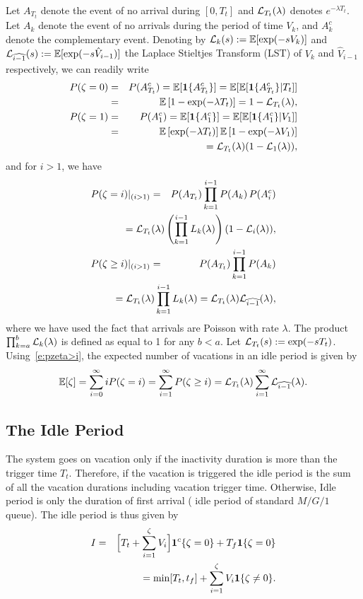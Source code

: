 \documentclass[journal]{IEEEtran}
\newcommand {\beq} {\begin{equation}}
\newcommand {\eeq} {\end{equation}}
\newcommand {\bear} {\begin{eqnarray}}
\newcommand {\eear} {\end{eqnarray}}
\def \E{{\mathbb E}}
\def\bone{{\mathrm 1\!\!I}}
\def\bone{{\textbf 1}}
\begin{document}
Let $A_{T_t}$ denote the event of no arrival during $[0,T_t]$ and ${\cal L}_{T_t}(\lambda)$ denotes  $e^{-\lambda T_t}$. Let $A_k$ denote the event of no arrivals during the period of time $V_k$, and $A_k^c$ denote the complementary event. Denoting by ${\cal L}_k(s):=\E[\exp(-s V_k)]$ and ${\cal L}_{\widehat{i-1}}(s):=\E[\exp(-s \hat{V}_{i-1})]$ the Laplace Stieltjes Transform (LST) of $V_k$ and $\hat V_{i-1}$ respectively, we can readily write \vspace{-1mm}
\bear
P(\zeta=0)&=&P(A_{T_t}^c)=\E[\bone\{A_{T_t}^c\}]=\E[\E[\bone\{A_{T_t}^c\}|T_t]]
\nonumber\\ 
\label{e:pzeta-0}&=& \E\left[1-\exp(-\lambda T_t)\right]=1-{\cal L}_{T_t}(\lambda),\\
P(\zeta=1)&=&P(A_1^c)=\E[\bone\{A_1^c\}]=\E[\E[\bone\{A_1^c\}|V_1]]
\nonumber\\
&=&\nonumber\E\left[\exp(-\lambda T_t)\right]\E\left[1-\exp(-\lambda V_1)\right]\\
&&={\cal L}_{T_t}(\lambda)(1-{\cal L}_1(\lambda)),
\label{e:pzeta-1}
\eear
and for $i>1$, we have\vspace{-1mm}
\bear
P(\zeta=i)|_{(i>1)}&=&P(A_{T_t})\prod_{k=1}^{i-1}P(A_k)\,P(A_i^c)\nonumber\\
&&\hspace{-20mm}={\cal L}_{T_t}(\lambda)\left(\prod_{k=1}^{i-1}L_k(\lambda)\right)(1-{\cal L}_i(\lambda)),
\label{e:pzeta-i}\\
\nonumber P(\zeta\geq i)|_{(i>1)}&=&P(A_{T_t})\prod_{k=1}^{i-1}P(A_k)\\
&&\hspace{-20mm}={\cal L}_{T_t}(\lambda)\prod_{k=1}^{i-1}L_k(\lambda)
= {\cal L}_{T_t}(\lambda){\cal L}_{\widehat{i-1}}(\lambda), \label{e:pzeta>i} \eear
where we have used the fact that arrivals are Poisson with rate $\lambda$. The product $\prod_{k=a}^b{\cal L}_k(\lambda)$ is defined as equal to 1 for any $b<a$. Let ${\cal L}_{T_t}(s):=\exp(-s
T_t)$. Using~\eqref{e:pzeta>i}, the expected number of vacations in an idle period is given by
\beq 
\E[\zeta]=\sum_{i=0}^{\infty}iP(\zeta=i)=\sum_{i=1}^{\infty}P(\zeta\geq i)
={\cal L}_{T_t}(\lambda)\sum_{i=1}^{\infty}{\cal L}_{\widehat{i-1}}(\lambda).
\label{e:Ezeta}
\eeq

\subsection{The Idle Period}
The system goes on vacation only if the inactivity duration is more than the trigger time $T_t$. Therefore, if the vacation is triggered the idle period is the sum of all the vacation durations including vacation trigger time. Otherwise, Idle period is only the duration of first arrival ( idle period of standard $M/G/1$ queue). 
The idle period is thus given by 
\bear
I&=&\Big[ T_t+\sum_{i=1}^\zeta V_i\Big]{\bone^c{\{\zeta=0\}}} +{T_f}{\bone{\{\zeta=0\}}}
\nonumber \\&&= \min[T_t, t_f]+\sum_{i=1}^\zeta V_i{\bone{\{\zeta\neq 0\}}}.
\eear
\end{document}
